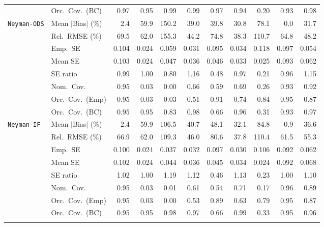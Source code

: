 \begin{landscape}
\begin{longtable}{llrrrrrrrrr}
 & Orc.\ Cov.\ (BC) & \cellcolor{rankthree}0.97 & \cellcolor{rankone}0.95 & 0.99 & 0.99 & \cellcolor{rankthree}0.97 & \cellcolor{ranktwo}0.94 & 0.20 & \cellcolor{rankthree}0.93 & 0.98 \\
\addlinespace[2pt]
\quad \texttt{Neyman-ODS} & Mean $|$Bias$|$ (\%) & \cellcolor{ranktwo}2.4 & 59.9 & 150.2 & 39.0 & 39.8 & \cellcolor{rankthree}30.8 & 78.1 & \cellcolor{rankone}0.0 & 31.7 \\
 & Rel.\ RMSE (\%) & 69.5 & 62.0 & 155.3 & \cellcolor{ranktwo}44.2 & 74.8 & \cellcolor{rankone}38.3 & 110.7 & 64.8 & \cellcolor{rankthree}48.2 \\
 & Emp.\ SE & 0.104 & 0.024 & 0.059 & 0.031 & 0.095 & 0.034 & 0.118 & 0.097 & 0.054 \\
 & Mean SE & 0.103 & 0.024 & 0.047 & 0.036 & 0.046 & 0.033 & 0.025 & 0.093 & 0.062 \\
 & SE ratio & \cellcolor{ranktwo}0.99 & \cellcolor{rankone}1.00 & 0.80 & 1.16 & 0.48 & \cellcolor{rankthree}0.97 & 0.21 & 0.96 & 1.15 \\
 & Nom.\ Cov. & \cellcolor{rankone}0.95 & 0.03 & 0.00 & 0.66 & 0.59 & 0.69 & 0.26 & \cellcolor{ranktwo}0.93 & \cellcolor{rankthree}0.92 \\
 & Orc.\ Cov.\ (Emp) & \cellcolor{rankone}0.95 & 0.03 & 0.03 & 0.51 & \cellcolor{ranktwo}0.91 & 0.74 & 0.84 & \cellcolor{rankone}0.95 & \cellcolor{rankthree}0.87 \\
 & Orc.\ Cov.\ (BC) & \cellcolor{rankone}0.95 & \cellcolor{rankone}0.95 & 0.83 & 0.98 & 0.66 & \cellcolor{ranktwo}0.96 & 0.31 & \cellcolor{rankthree}0.93 & \cellcolor{rankthree}0.97 \\
\addlinespace[2pt]
\quad \texttt{Neyman-IF} & Mean $|$Bias$|$ (\%) & \cellcolor{ranktwo}2.4 & 59.9 & 106.5 & 40.7 & 48.1 & \cellcolor{rankthree}32.1 & 84.8 & \cellcolor{rankone}0.9 & 36.6 \\
 & Rel.\ RMSE (\%) & 66.9 & 62.0 & 109.3 & \cellcolor{ranktwo}46.0 & 80.6 & \cellcolor{rankone}37.8 & 110.4 & 61.5 & \cellcolor{rankthree}55.3 \\
 & Emp.\ SE & 0.100 & 0.024 & 0.037 & 0.032 & 0.097 & 0.030 & 0.106 & 0.092 & 0.062 \\
 & Mean SE & 0.102 & 0.024 & 0.044 & 0.036 & 0.045 & 0.034 & 0.024 & 0.092 & 0.068 \\
 & SE ratio & \cellcolor{ranktwo}1.02 & \cellcolor{rankone}1.00 & 1.19 & 1.12 & 0.46 & 1.13 & 0.23 & \cellcolor{rankone}1.00 & \cellcolor{rankthree}1.10 \\
 & Nom.\ Cov. & \cellcolor{rankone}0.95 & 0.03 & 0.01 & 0.61 & 0.54 & 0.71 & 0.17 & \cellcolor{ranktwo}0.96 & \cellcolor{rankthree}0.89 \\
 & Orc.\ Cov.\ (Emp) & \cellcolor{rankone}0.95 & 0.03 & 0.00 & 0.53 & \cellcolor{ranktwo}0.89 & 0.63 & 0.79 & \cellcolor{rankone}0.95 & \cellcolor{rankthree}0.87 \\
 & Orc.\ Cov.\ (BC) & \cellcolor{rankone}0.95 & \cellcolor{rankone}0.95 & 0.98 & \cellcolor{rankthree}0.97 & 0.66 & 0.99 & 0.33 & \cellcolor{rankone}0.95 & \cellcolor{ranktwo}0.96 \\
\addlinespace[2pt]
\end{longtable}
\end{landscape}
